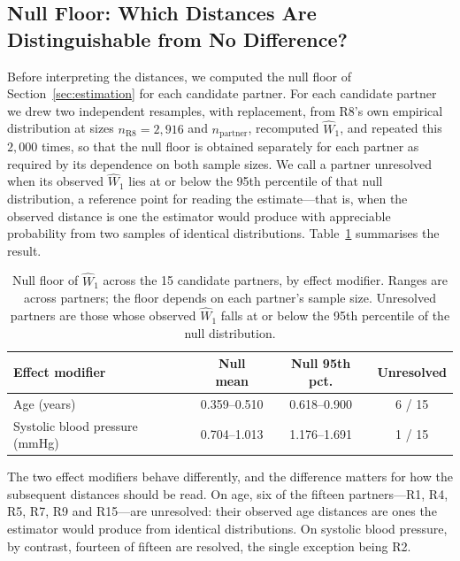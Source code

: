 \documentclass[AMA,Times1COL]{WileyNJDv5}
\begin{document}
\subsection{Null Floor: Which Distances Are Distinguishable from No Difference?}\label{sec:app_operability}

Before interpreting the distances, we computed the null floor of Section~\ref{sec:estimation} for each candidate partner. For each candidate partner we drew two independent resamples, with replacement, from R8's own empirical distribution at sizes $n_{\text{R8}} = 2{,}916$ and $n_{\text{partner}}$, recomputed $\widehat{W}_1$, and repeated this $2{,}000$ times, so that the null floor is obtained separately for each partner as required by its dependence on both sample sizes. We call a partner unresolved when its observed $\widehat{W}_1$ lies at or below the 95th percentile of that null distribution, a reference point for reading the estimate---that is, when the observed distance is one the estimator would produce with appreciable probability from two samples of identical distributions. Table~\ref{tab:operability} summarises the result.

\begin{table}[ht]
\centering
\caption{Null floor of $\widehat{W}_1$ across the 15 candidate partners, by effect modifier. Ranges are across partners; the floor depends on each partner's sample size. Unresolved partners are those whose observed $\widehat{W}_1$ falls at or below the 95th percentile of the null distribution.\label{tab:operability}}
\begin{tabular}{lccc}
\toprule
\textbf{Effect modifier} & \textbf{Null mean} & \textbf{Null 95th pct.} & \textbf{Unresolved} \\
\midrule
Age (years) & 0.359--0.510 & 0.618--0.900 & 6 / 15 \\
Systolic blood pressure (mmHg) & 0.704--1.013 & 1.176--1.691 & 1 / 15 \\
\bottomrule
\end{tabular}
\end{table}

The two effect modifiers behave differently, and the difference matters for how the subsequent distances should be read. On age, six of the fifteen partners---R1, R4, R5, R7, R9 and R15---are unresolved: their observed age distances are ones the estimator would produce from identical distributions. On systolic blood pressure, by contrast, fourteen of fifteen are resolved, the single exception being R2.
\end{document}
